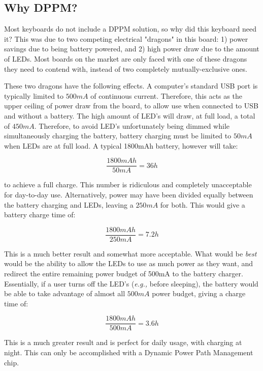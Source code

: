 \documentclass[11pt]{article}
\begin{document}
\subsection{Why DPPM?}

Most keyboards do not include a DPPM solution, so why did this keyboard need it? This was due to two competing electrical "dragons" in this board: 1) power savings due to being battery powered, and 2) high power draw due to the amount of LEDs. Most boards on the market are only faced with one of these dragons they need to contend with, instead of two completely mutually-exclusive ones.\footnotemark {} 

These two dragons have the following effects. A computer's standard USB port is typically limited to \(500mA\) of continuous current. Therefore, this acts as the upper ceiling of power draw from the board, to allow use when connected to USB and without a battery. The high amount of LED's will draw, at full load, a total of \(450mA\).\footnotemark {} Therefore, to avoid LED's unfortunately being dimmed while simultaneously charging the battery, battery charging must be limited to \(50mA\) when LEDs are at full load. A typical 1800mAh battery, however will take:

$$ \frac{1800mAh}{50mA} = 36h $$

to achieve a full charge. This number is ridiculous and completely unacceptable for day-to-day use. Alternatively, power may have been divided equally between the battery charging and LEDs, leaving a \(250mA\) for both. This would give a battery charge time of:

$$ \frac{1800mAh}{250mA} = 7.2h $$

This is a much better result and somewhat more acceptable. What would be \emph{best} would be the ability to allow the LEDs to use as much power as they want, and redirect the entire remaining power budget of 500mA to the battery charger. Essentially, if a user turns off the LED's (\emph{e.g.,} before sleeping), the battery would be able to take advantage of almost all \(500mA\) power budget, giving a charge time of:

$$ \frac{1800mAh}{500mA} = 3.6h $$

This is a much greater result and is perfect for daily usage, with charging at night. This can only be accomplished with a Dynamic Power Path Management chip.
\end{document}
